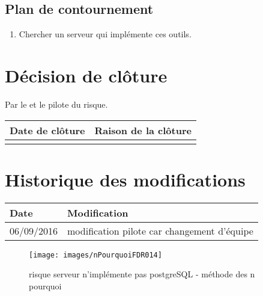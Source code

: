 \flushleft
\subsection*{Plan de contournement}

\begin{enumerate}
	\item Chercher un serveur qui implémente ces outils. 
\end{enumerate}

\section*{Décision de clôture}
Par le \CP{} et le pilote du risque.
\begin{table}[H]
\centering
	\begin{tabularx}{16.8cm}{|X|X|}
	\hline
	\rowcolor{gray!40} Date de clôture & Raison de la clôture \\
	\hline
	  & \\
	\hline
	\end{tabularx}
\end{table}

\section*{Historique des modifications}
\begin{table}[H]
\centering
	\begin{tabularx}{16.8cm}{|X|X|}
	\hline
	\rowcolor{gray!40} Date & Modification \\
	\hline
	 06/09/2016 & modification pilote car changement d'équipe \\
	\hline
	\end{tabularx}
\end{table}
\newpage


\begin{figure}
	\centering
	\texttt{[image: images/nPourquoiFDR014]}
	\caption{\label{serveur pas postgre}risque serveur n'implémente pas postgreSQL - méthode des n pourquoi}
\end{figure}